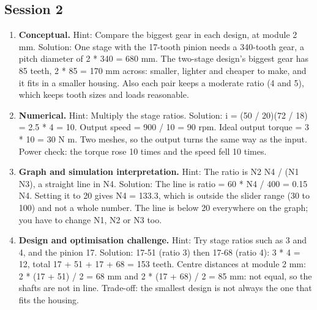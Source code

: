 \documentclass[11pt,a4paper]{article}
\begin{document}
\subsection*{Session 2}
\begin{enumerate}[nosep]
\item \textbf{Conceptual.} Hint: Compare the biggest gear in each design, at module 2 mm. Solution: One stage with the 17-tooth pinion needs a 340-tooth gear, a pitch diameter of 2 * 340 = 680 mm. The two-stage design's biggest gear has 85 teeth, 2 * 85 = 170 mm across: smaller, lighter and cheaper to make, and it fits in a smaller housing. Also each pair keeps a moderate ratio (4 and 5), which keeps tooth sizes and loads reasonable.
\item \textbf{Numerical.} Hint: Multiply the stage ratios. Solution: i = (50 / 20)(72 / 18) = 2.5 * 4 = 10. Output speed = 900 / 10 = 90 rpm. Ideal output torque = 3 * 10 = 30 N m. Two meshes, so the output turns the same way as the input. Power check: the torque rose 10 times and the speed fell 10 times.
\item \textbf{Graph and simulation interpretation.} Hint: The ratio is N2 N4 / (N1 N3), a straight line in N4. Solution: The line is ratio = 60 * N4 / 400 = 0.15 N4. Setting it to 20 gives N4 = 133.3, which is outside the slider range (30 to 100) and not a whole number. The line is below 20 everywhere on the graph; you have to change N1, N2 or N3 too.
\item \textbf{Design and optimisation challenge.} Hint: Try stage ratios such as 3 and 4, and the pinion 17. Solution: 17-51 (ratio 3) then 17-68 (ratio 4): 3 * 4 = 12, total 17 + 51 + 17 + 68 = 153 teeth. Centre distances at module 2 mm: 2 * (17 + 51) / 2 = 68 mm and 2 * (17 + 68) / 2 = 85 mm: not equal, so the shafts are not in line. Trade-off: the smallest design is not always the one that fits the housing.
\end{enumerate}
\end{document}
